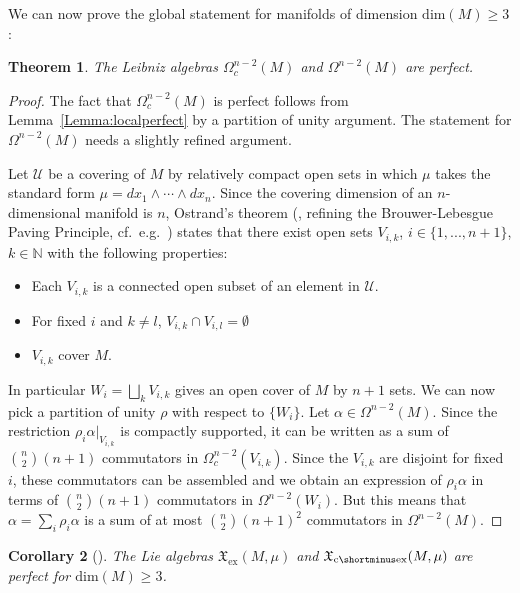 \documentclass{article}
\newcommand{\ex}{\mathrm{ex}}
\newcommand{\fX}{\mathfrak{X}}
\newcommand{\ceX}{\fX_{\mathrm{c}\shortminus\mathrm{ex}}}
\newtheorem{Theorem}{Theorem}[section]
\newtheorem{Corollary}[Theorem]{Corollary}
\theoremstyle{definition}
\begin{document}
We can now prove the global statement for manifolds of dimension $\mathrm{dim}(M)\geq 3$:

\begin{Theorem}\label{Thm:perfect}
The Leibniz algebras $\Omega^{n-2}_{c}(M)$ and $\Omega^{n-2}(M)$ are perfect.
\end{Theorem}
\begin{proof}
The fact that $\Omega_{c}^{n-2}(M)$ is perfect follows from Lemma~\ref{Lemma:localperfect} by a partition of unity argument. The statement for $\Omega^{n-2}(M)$ needs a slightly refined argument.

Let $\mathcal U$ be a covering of $M$ by relatively compact open sets in which $\mu$ takes the standard form $\mu = {dx_1\wedge \cdots \wedge dx_n}$. Since the covering dimension of an $n$-dimensional manifold is $n$, Ostrand's theorem (\cite[Theorem 1]{ostrandCoveringDimensionGeneral1971}, refining the 
Brouwer-Lebesgue Paving Principle, cf.\ e.g.\ \cite{HurewiczWallman1941}) states that there exist open sets $V_{i,k}$, $i\in\{1,...,n+1\}$, $k\in\mathbb N$ with the following properties:
\begin{itemize}
	\item Each $V_{i,k}$ is a connected open subset of an element in $\mathcal U$.
	\item For fixed $i$ and $k\neq l$, $V_{i,k}\cap V_{i,l}=\emptyset$
	\item $V_{i,k}$ cover $M$.
		\end{itemize}
In particular $W_i=\bigsqcup_k V_{i,k}$ gives an open cover of $M$ by $n+1$ sets. We can now pick a partition of unity $\rho$ with respect to $\{W_i\}$. Let  $\alpha\in \Omega^{n-2}(M)$. Since the restriction $\rho_i\alpha|_{V_{i,k}}$ is compactly supported, it can be written as a sum of $\binom{n}{2}(n+1)$ commutators 
in $\Omega^{n-2}_{c}(V_{i,k})$.
Since the $V_{i,k}$ are disjoint for fixed $i$, these commutators can be assembled and we obtain an expression of $\rho_i\alpha$ in terms of $\binom{n}{2}(n+1)$ commutators in $\Omega^{n-2}(W_i)$. But this means that $\alpha=\sum_i \rho_i\alpha$ is a sum of at most $\binom{n}{2}(n+1)^2$ commutators
in $\Omega^{n-2}(M)$.
\end{proof}




\begin{Corollary}[\cite{Omori1974, Lichnerowicz1974}]\label{PerfectLA}
The Lie algebras $\fX_{\ex}(M, \mu)$ and $\ceX(M, \mu)$ are perfect for $\mathrm{dim}(M)\geq 3$.
\end{Corollary}
\end{document}
